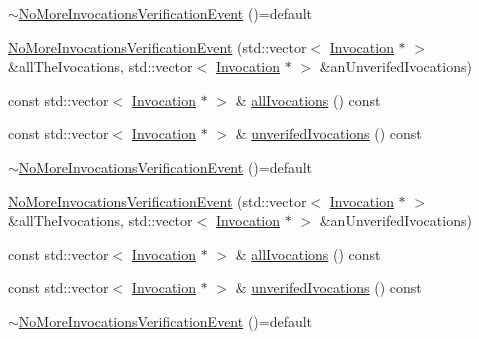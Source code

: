 \begin{DoxyCompactItemize}
\item 
\mbox{\hyperlink{structfakeit_1_1NoMoreInvocationsVerificationEvent_a1db7bd8cb45dc62b87c744e628b93d4d}{$\sim$\+No\+More\+Invocations\+Verification\+Event}} ()=default
\item 
\mbox{\hyperlink{structfakeit_1_1NoMoreInvocationsVerificationEvent_a4c590fe7b3fb11f7121af65f4a0d3ed5}{No\+More\+Invocations\+Verification\+Event}} (std\+::vector$<$ \mbox{\hyperlink{structfakeit_1_1Invocation}{Invocation}} $\ast$ $>$ \&all\+The\+Ivocations, std\+::vector$<$ \mbox{\hyperlink{structfakeit_1_1Invocation}{Invocation}} $\ast$ $>$ \&an\+Unverifed\+Ivocations)
\item 
const std\+::vector$<$ \mbox{\hyperlink{structfakeit_1_1Invocation}{Invocation}} $\ast$ $>$ \& \mbox{\hyperlink{structfakeit_1_1NoMoreInvocationsVerificationEvent_aa69cf6dc4a816429653a5885f38d07b5}{all\+Ivocations}} () const
\item 
const std\+::vector$<$ \mbox{\hyperlink{structfakeit_1_1Invocation}{Invocation}} $\ast$ $>$ \& \mbox{\hyperlink{structfakeit_1_1NoMoreInvocationsVerificationEvent_aaff3cb0916a4fe853f6f4e5fcc7f2632}{unverifed\+Ivocations}} () const
\item 
\mbox{\hyperlink{structfakeit_1_1NoMoreInvocationsVerificationEvent_a1db7bd8cb45dc62b87c744e628b93d4d}{$\sim$\+No\+More\+Invocations\+Verification\+Event}} ()=default
\item 
\mbox{\hyperlink{structfakeit_1_1NoMoreInvocationsVerificationEvent_a4c590fe7b3fb11f7121af65f4a0d3ed5}{No\+More\+Invocations\+Verification\+Event}} (std\+::vector$<$ \mbox{\hyperlink{structfakeit_1_1Invocation}{Invocation}} $\ast$ $>$ \&all\+The\+Ivocations, std\+::vector$<$ \mbox{\hyperlink{structfakeit_1_1Invocation}{Invocation}} $\ast$ $>$ \&an\+Unverifed\+Ivocations)
\item 
const std\+::vector$<$ \mbox{\hyperlink{structfakeit_1_1Invocation}{Invocation}} $\ast$ $>$ \& \mbox{\hyperlink{structfakeit_1_1NoMoreInvocationsVerificationEvent_aa69cf6dc4a816429653a5885f38d07b5}{all\+Ivocations}} () const
\item 
const std\+::vector$<$ \mbox{\hyperlink{structfakeit_1_1Invocation}{Invocation}} $\ast$ $>$ \& \mbox{\hyperlink{structfakeit_1_1NoMoreInvocationsVerificationEvent_aaff3cb0916a4fe853f6f4e5fcc7f2632}{unverifed\+Ivocations}} () const
\item 
\mbox{\hyperlink{structfakeit_1_1NoMoreInvocationsVerificationEvent_a1db7bd8cb45dc62b87c744e628b93d4d}{$\sim$\+No\+More\+Invocations\+Verification\+Event}} ()=default
\item 

\end{DoxyCompactItemize}
